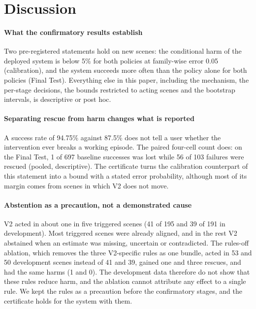 \section{Discussion}\label{sec:discussion}

\paragraph{What the confirmatory results establish} Two pre-registered statements hold on new scenes: the conditional harm of the deployed system is below 5\% for both policies at family-wise error 0.05 (calibration), and the system succeeds more often than the policy alone for both policies (Final Test). Everything else in this paper, including the mechanism, the per-stage decisions, the bounds restricted to acting scenes and the bootstrap intervals, is descriptive or post hoc.

\paragraph{Separating rescue from harm changes what is reported} A success rate of 94.75\% against 87.5\% does not tell a user whether the intervention ever breaks a working episode. The paired four-cell count does: on the Final Test, 1 of 697 baseline successes was lost while 56 of 103 failures were rescued (pooled, descriptive). The certificate turns the calibration counterpart of this statement into a bound with a stated error probability, although most of its margin comes from scenes in which V2 does not move.

\paragraph{Abstention as a precaution, not a demonstrated cause} V2 acted in about one in five triggered scenes (41 of 195 and 39 of 191 in development). Most triggered scenes were already aligned, and in the rest V2 abstained when an estimate was missing, uncertain or contradicted. The rules-off ablation, which removes the three V2-specific rules as one bundle, acted in 53 and 50 development scenes instead of 41 and 39, gained one and three rescues, and had the same harms (1 and 0). The development data therefore do not show that these rules reduce harm, and the ablation cannot attribute any effect to a single rule. We kept the rules as a precaution before the confirmatory stages, and the certificate holds for the system with them.

